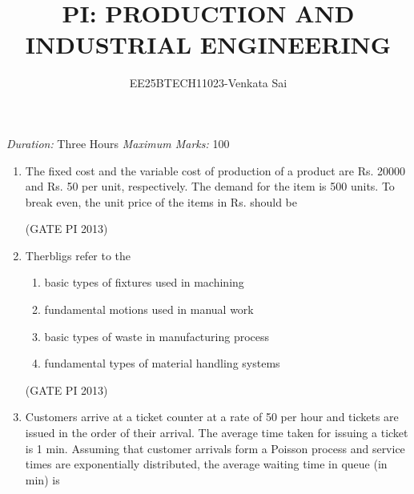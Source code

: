 \documentclass[journal,12pt,onecolumn]{IEEEtran}
\title{PI: PRODUCTION AND INDUSTRIAL ENGINEERING}
\author{EE25BTECH11023-Venkata Sai}
\theoremstyle{remark}
\begin{document}
\noindent
\maketitle
\textit{Duration:} Three Hours \hfill \textit{Maximum Marks:} 100

\begin{enumerate}

\item The fixed cost and the variable cost of production of a product are Rs. 20000 and Rs. 50 per unit, 
respectively. The demand for the item is 500 units. To break even, the unit price of the items in  
Rs. should be 

\begin{enumerate}
\end{enumerate}

\hfill (GATE PI 2013)

\item Therbligs refer to the 
\begin{enumerate}
\item basic types of fixtures used in machining
\item fundamental motions used in manual work
\item basic types of waste in manufacturing process
\item fundamental types of material handling systems \\
\end{enumerate}

\hfill (GATE PI 2013)

\item Customers arrive at a ticket counter at a rate of 50 per hour and tickets are issued in the order of their 
arrival. The average time taken for issuing a ticket is 1 min. Assuming that customer arrivals form a 
Poisson process and service times are exponentially distributed, the average waiting time in queue 
(in min) is 

\begin{enumerate}
\end{enumerate}


\end{enumerate}
\end{document}
